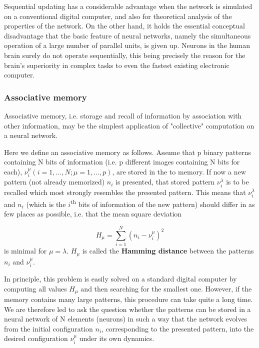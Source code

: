  Sequential updating has a considerable advantage when the network is simulated on a conventional digital computer, and also for theoretical analysis of the properties of the network. On the other hand, it holds the essential conceptual disadvantage that the basic feature of neural networks, namely the simultaneous operation of a large number of parallel units, is given up. Neurons in the human brain surely do not operate sequentially, this being precisely the reason for the brain's superiority in complex tasks to even the fastest existing electronic computer.


\subsubsection{Associative memory}
Associative memory, i.e. storage and recall of information by association with
other information, may be the simplest application of "collective" computation on a neural network.

Here we define an associative memory as follows. Assume that p binary patterns containing N bits of information (i.e. p different images containing N bits for each), $\nu_{i}^{\mu}(i = 1, \dots , N;\mu=1,\dots,p)$, are stored in the to memory. If now a new pattern (not already memorized) $n_{i}$ is presented, that stored pattern $\nu_{i}^{\lambda}$ is to be recalled which most strongly resembles the presented pattern. This means that $\nu_{i}^{\lambda}$ and $n_{i}$ (which is the $i$\textsuperscript{th} bits of information of the new pattern) should differ in as few places as possible, i.e. that the mean square deviation 
 
\begin{equation}
    H_{\mu}=\sum_{i=1}^{N}(n_{i}-\nu_{i}^{\mu})^2
\end{equation}
is minimal for $\mu=\lambda$. $H_{\mu}$ is called the \textbf{Hamming distance} between the patterns $n_{i}$ and $\nu_{i}^{\mu}$.

In principle, this problem is easily solved on a standard digital computer by computing all values $H_{\mu}$ and then searching for the smallest one. However, if the memory contains many large patterns, this procedure can take quite a long time. We are therefore led to ask the question whether the patterns can be stored in a neural network of N elements (neurons) in such a way that the network evolves from the initial configuration $n_{i}$, corresponding to the presented pattern, into the desired configuration  $\nu_{i}^{\mu}$ under its own dynamics.

